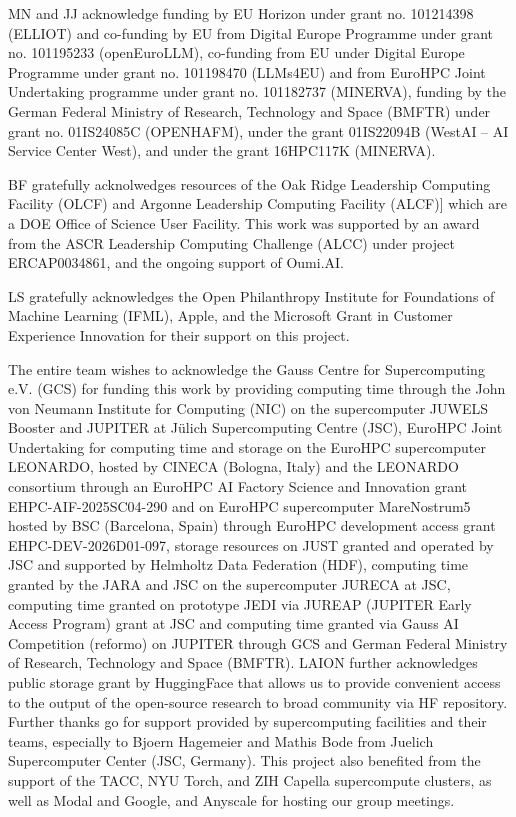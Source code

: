 \documentclass{article}
\begin{document}
\begin{ack}
\label{sec:acknowledgements}

MN and JJ acknowledge funding by EU Horizon under grant no. 101214398 (ELLIOT) and co-funding by EU from Digital Europe Programme under grant no. 101195233 (openEuroLLM), co-funding from EU under Digital Europe Programme under grant no. 101198470 (LLMs4EU) and from EuroHPC Joint Undertaking programme under grant no. 101182737 (MINERVA), funding by the German Federal Ministry of Research, Technology and Space (BMFTR) under grant no. 01IS24085C (OPENHAFM), under the grant 01IS22094B (WestAI -- AI Service Center West), and under the grant 16HPC117K (MINERVA).

BF gratefully acknolwedges resources of the Oak Ridge Leadership Computing Facility (OLCF) and Argonne Leadership Computing Facility (ALCF)] which are a DOE Office of Science User Facility. This work was supported by an award from the ASCR Leadership Computing Challenge (ALCC) under project ERCAP0034861, and the ongoing support of Oumi.AI.

LS gratefully acknowledges the Open Philanthropy Institute for Foundations of Machine Learning (IFML), Apple, and the Microsoft Grant in Customer Experience Innovation for their support on this project.

The entire team wishes to acknowledge the Gauss Centre for Supercomputing e.V. (GCS) for funding this work by providing computing time through the John von Neumann Institute for Computing (NIC) on the supercomputer JUWELS Booster and JUPITER at J\"ulich Supercomputing Centre (JSC), EuroHPC Joint Undertaking for computing time and storage on the EuroHPC supercomputer LEONARDO, hosted by CINECA (Bologna, Italy) and the LEONARDO consortium through an EuroHPC AI Factory Science and Innovation grant EHPC-AIF-2025SC04-290 and on EuroHPC supercomputer MareNostrum5 hosted by BSC (Barcelona, Spain) through EuroHPC development access grant EHPC-DEV-2026D01-097, storage resources on JUST granted and operated by JSC and supported by Helmholtz Data Federation (HDF), computing time granted by the JARA and JSC on the supercomputer JURECA at JSC, computing time granted on prototype JEDI via JUREAP (JUPITER Early Access Program) grant at JSC and computing time granted via Gauss AI Competition (reformo) on JUPITER through GCS and German Federal Ministry of Research, Technology and Space (BMFTR). LAION further acknowledges public storage grant by HuggingFace that allows us to provide convenient access to the output of the open-source research to broad community via HF repository. Further thanks go for support provided by supercomputing facilities and their teams, especially to Bjoern Hagemeier and Mathis Bode from Juelich Supercomputer Center (JSC, Germany). This project also benefited from the support of the TACC, NYU Torch, and ZIH Capella supercompute clusters, as well as Modal and Google, and Anyscale for hosting our group meetings. 


\end{ack}
\end{document}
